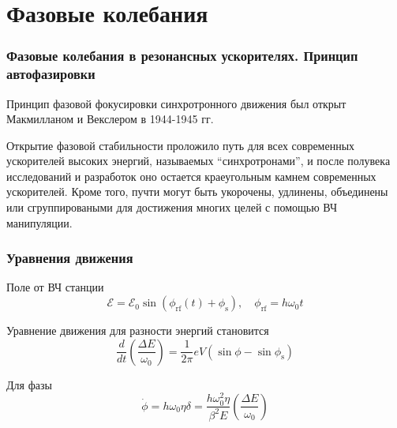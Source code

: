 \section{Фазовые колебания}

\begin{frame}
	\frametitle{Фазовые колебания в резонансных ускорителях. Принцип автофазировки}
	\par Принцип фазовой фокусировки синхротронного движения был открыт Макмилланом и Векслером в 1944-1945 гг. 
	\newline
	\par Открытие фазовой стабильности проложило путь для всех современных ускорителей высоких энергий, называемых “синхротронами”, и после полувека исследований и разработок оно остается краеугольным камнем современных ускорителей. Кроме того, пучти могут быть укорочены, удлинены, объединены или сгруппироваными для достижения многих целей с помощью ВЧ манипуляции.
\end{frame}

\begin{frame}
	\frametitle{Уравнения движения}
	
	\par Поле от ВЧ станции
	\begin{equation}
		\mathcal{E}=\mathcal{E}_0 \sin \left(\phi_{\mathrm{rf}}(t)+\phi_{\mathrm{s}}\right), \quad \phi_{\mathrm{rf}}=h \omega_0 t
	\end{equation}
	
	\par Уравнение движения для разности энергий становится
	\begin{equation}
		\frac{d}{d t}\left(\frac{\Delta E}{\omega_0}\right)=\frac{1}{2 \pi} e V\left(\sin \phi-\sin \phi_{\mathrm{s}}\right)
	\end{equation}
	
	\par Для фазы
	\begin{equation}
		\dot{\phi}=h \omega_0 \eta \delta=\frac{h \omega_0^2 \eta}{\beta^2 E}\left(\frac{\Delta E}{\omega_0}\right)
	\end{equation}
	

\end{frame}


